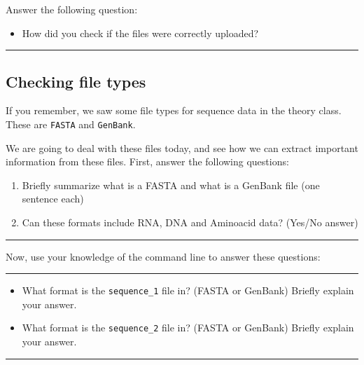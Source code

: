 \documentclass[
]{book}
\providecommand{\tightlist}{%
  \setlength{\itemsep}{0pt}\setlength{\parskip}{0pt}}
\begin{document}
Answer the following question:

\begin{itemize}
\tightlist
\item
  How did you check if the files were correctly uploaded?
\end{itemize}

\begin{center}\rule{0.5\linewidth}{0.5pt}\end{center}

\hypertarget{checking-file-types}{%
\subsection{Checking file types}\label{checking-file-types}}

If you remember, we saw some file types for sequence data in the theory class. These are \texttt{FASTA} and \texttt{GenBank}.

We are going to deal with these files today, and see how we can extract important information from these files. First, answer the following questions:

\begin{enumerate}
\def\labelenumi{\arabic{enumi}.}
\item
  Briefly summarize what is a FASTA and what is a GenBank file (one sentence each)
\item
  Can these formats include RNA, DNA and Aminoacid data? (Yes/No answer)
\end{enumerate}

\begin{center}\rule{0.5\linewidth}{0.5pt}\end{center}

Now, use your knowledge of the command line to answer these questions:

\begin{center}\rule{0.5\linewidth}{0.5pt}\end{center}

\begin{itemize}
\tightlist
\item
  What format is the \texttt{sequence\_1} file in? (FASTA or GenBank) Briefly explain your answer.
\item
  What format is the \texttt{sequence\_2} file in? (FASTA or GenBank) Briefly explain your answer.
\end{itemize}

\begin{center}\rule{0.5\linewidth}{0.5pt}\end{center}
\end{document}
